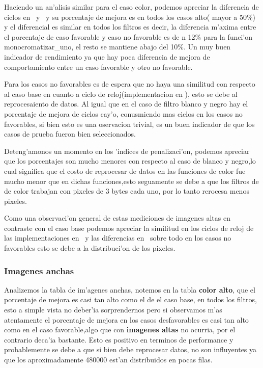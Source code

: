 Haciendo un an'alisis similar para el caso color, 
podemos apreciar la diferencia de ciclos en \C \ y \ass \ y su porcentaje de mejora es en todos los casos
alto( mayor a 50\%) y el diferencial es similar en todos los filtros es decir,
la diferencia m'axima entre el porcentaje de caso favorable y caso no favorable es de n 12\% para la funci'on monocromatizar_uno,
el resto se mantiene abajo del 10\%. Un muy buen indicador de rendimiento ya que hay poca diferencia de mejora de
comportamiento entre un caso favorable y otro no favorable.

Para los casos no favorables es de espera que no haya una similitud con respecto al caso base en cuanto a ciclo de 
reloj(implementacion en \ass ), esto se debe al reprocesaiento de datos. Al igual que en el caso de filtro blanco y negro
hay el porcentaje de mejora de ciclos cay'o, conusmiendo mas ciclos en los casos no favorables, si bien esto es una 
oservacion trivial, es un buen indicador de que los casos de prueba fueron bien seleccionados.

Deteng'amonos un momento en los 'indices de penalizaci'on, podemos apreciar que los porcentajes son mucho 
menores con respecto al caso de blanco y negro,lo cual significa que el costo de reprocesar de datos en
las funciones de color fue mucho menor que en dichas funciones,esto seguamente se debe a que los filtros de de color
trabajan con pixeles de 3 bytes cada uno, por lo tanto rerocesa menos pixeles.

Como una observaci'on general de estas mediciones de imagenes altas en contraste con el caso base podemos apreciar la 
similitud en los ciclos de reloj de las implementaciones en \C \ y las diferencias en \ass \ sobre todo en los 
casos no favorables esto se debe a la distribuci'on de los pixeles.

\subsubsection{Imagenes anchas}
Analizemos la tabla de im'agenes anchas, notemos en la tabla \textbf{color alto}, que el porcentaje de mejora es
casi tan alto como el de el caso base, en todos los filtros, esto a simple vista no deber'ia
 sorprendernos pero si observamos m'as atentamente el porcentaje de mejora en los casos desfavorables es 
casi tan alto como en el caso favorable,algo que con \textbf{imagenes altas} no ocurria, por el contrario
deca'ia bastante. Esto es positivo en terminos de performance y probablemente se debe a que si bien
debe reprocesar datos, no son influyentes ya que los aproximadamente 480000 est'an distribuidos en
pocas filas.

